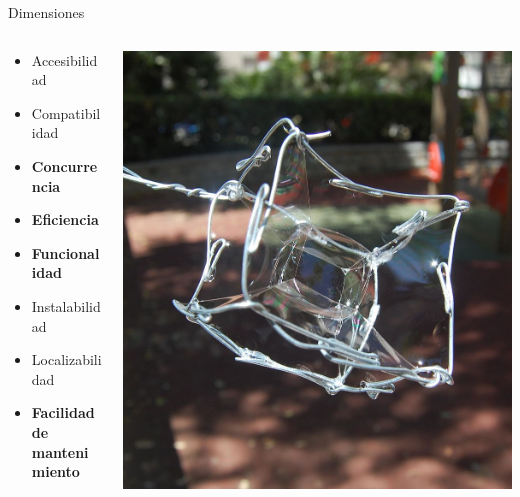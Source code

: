 \documentclass[aspectratio=169]{beamer}
\begin{document}
\begin{frame}{Dimensiones}
\begin{columns}[T]
	\begin{column}[T]{5cm}
		\begin{itemize}
			\item Accesibilidad
			\item Compatibilidad
			\item \textbf{Concurrencia}
			\item \textbf{Eficiencia}
			\item \textbf{Funcionalidad}
			\item Instalabilidad
			\item Localizabilidad
			\item \textbf{Facilidad de mantenimiento}
		\end{itemize}
	\end{column}
	\begin{column}[T]{5cm} %
		\includegraphics[width=\linewidth]{Images/teseracto}
	\end{column}
\end{columns}
\end{frame}
\end{document}
